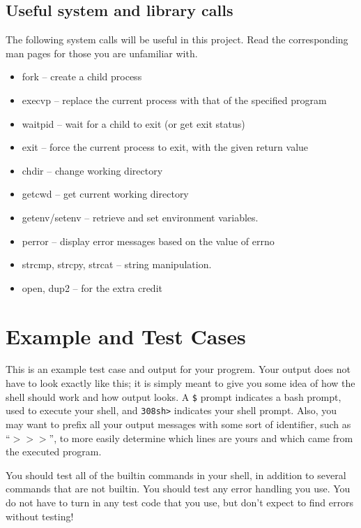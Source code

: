 \documentclass[letterpaper,10pt]{article}
\begin{document}
\subsection{Useful system and library calls}
The following system calls will be useful in this project. Read the corresponding man pages for those you are
unfamiliar with.

\begin{itemize}
 \item fork -- create a child process
 \item execvp -- replace the current process with that of the specified program
 \item waitpid -- wait for a child to exit (or get exit status)
 \item exit -- force the current process to exit, with the given return value
 \item chdir -- change working directory
 \item getcwd -- get current working directory
 \item getenv/setenv -- retrieve and set environment variables.
 \item perror -- display error messages based on the value of errno
 \item strcmp, strcpy, strcat -- string manipulation.
 \item open, dup2 -- for the extra credit
\end{itemize}

\section{Example and Test Cases}

This is an example test case and output for your progrem. Your output does not have to look exactly like this;
it is simply meant to give you some idea of how the shell should work and how output looks.
 A \verb=$= prompt indicates a bash prompt, used to execute your shell, and \verb+308sh>+ indicates your shell prompt.
Also, you may want to prefix all your output messages with some sort of identifier,
such as ``$>>>$”, to more easily determine which lines are yours and which came
from the executed program.

You should test all of the builtin commands in your shell, in addition to several commands that are not builtin.
You should test any error handling you use. You do not have to turn in any test code that you use, but don't expect
to find errors without testing!
\end{document}
